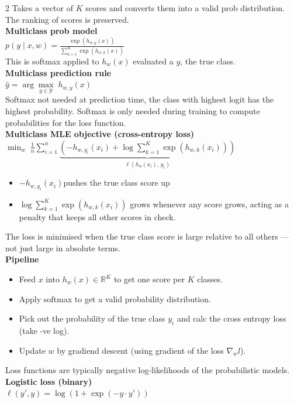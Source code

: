 \documentclass[10pt]{article}
\begin{document}
\begin{multicols*}{2}
Takes a vector of $K$ scores and converts them into a valid prob distribution. The ranking of scores is preserved.\\
\textbf{Multiclass prob model}\\
$p(y \mid x, w) = \frac{\exp(h_{w,y}(x))}{\sum_{k=1}^{K} \exp(h_{w,k}(x))}$\\
This is softmax applied to $h_w(x)$ evaluated a $y$, the true class.\\
\textbf{Multiclass prediction rule}\\
$\hat{y} = \arg\max\limits_{y \in \mathcal{Y}} \; h_{w,y}(x)$\\
Softmax not needed at prediction time, the class with highest logit has the highest probability.
Softmax is only needed during training to compute probabilities for the loss function.\\
\textbf{Multiclass MLE objective (cross-entropy loss)}\\
$\min_{w} \; \frac{1}{n} \sum_{i=1}^{n} \underbrace{\left( -h_{w,y_i}(x_i) + \log \sum_{k=1}^{K} \exp(h_{w,k}(x_i)) \right)}_{\ell(h_w(x_i),\, y_i)}$\\
\begin{itemize}
    \item $-h_{w,y_i}(x_i)$pushes the true class score up
    \item $\log \sum_{k=1}^{K} \exp(h_{w,k}(x_i))$ grows whenever any score grows, acting as a penalty that keeps all other scores in check.
\end{itemize}
The loss is minimised when the true class score is large relative to all others — not just large in absolute terms.\\
\textbf{Pipeline}
\begin{itemize}
    \item Feed $x$ into $h_w(x) \in \mathbb{R}^K$ to get one score per $K$ classes.
    \item Apply softmax to get a valid probability distribution.
    \item Pick out the probability of the true class $y_i$ and calc the cross entropy loss (take -ve log).
    \item Update $w$ by gradiend descent (using gradient of the loss $\nabla_w l$).
\end{itemize}
\vspace{1em}
Loss functions are typically negative log-likelihoods of the probabilistic models.\\
\textbf{Logistic loss (binary)}\\
$\ell(y', y) = \log(1 + \exp(-y \cdot y'))$\\

\end{multicols*}
\end{document}
